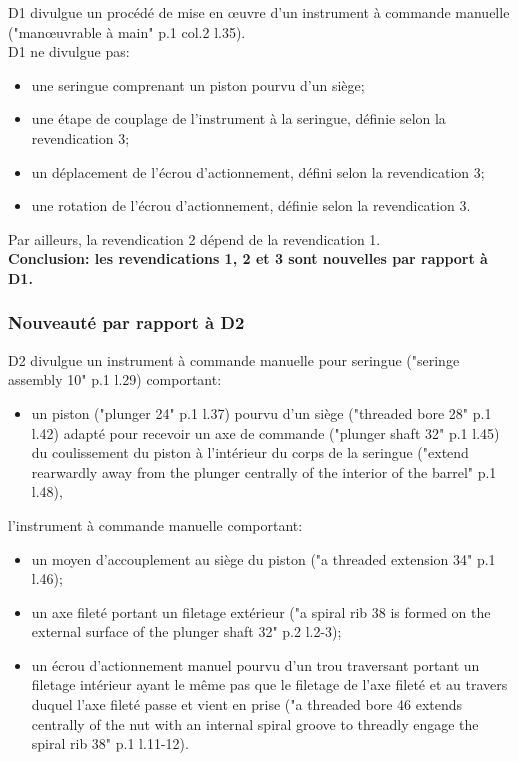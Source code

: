 D1 divulgue un procédé de mise en œuvre d'un instrument à commande manuelle
("manœuvrable à main" p.1 col.2 l.35).\\

D1 ne divulgue pas:
\begin{itemize}
  \item une seringue comprenant un piston pourvu d'un siège;
  \item une étape de couplage de l'instrument à la seringue, définie selon la revendication 3;
  \item un déplacement de l'écrou d'actionnement, défini selon la revendication 3;
  \item une rotation de l'écrou d'actionnement, définie selon la revendication 3.\\
\end{itemize}

Par ailleurs, la revendication 2 dépend de la revendication 1.\\

\textbf{Conclusion: les revendications 1, 2 et 3 sont nouvelles par rapport à D1.}\newpage

\subsubsection{Nouveauté par rapport à D2}

D2 divulgue un instrument à commande manuelle pour seringue
("seringe assembly 10" p.1 l.29) comportant:
\begin{itemize}
  \item un piston ("plunger 24" p.1 l.37) pourvu d'un siège ("threaded bore 28" p.1 l.42)
  adapté pour recevoir un axe de commande ("plunger shaft 32" p.1 l.45) du coulissement
  du piston à l'intérieur du corps de la seringue ("extend rearwardly away from
  the plunger centrally of the interior of the barrel" p.1 l.48),
\end{itemize}
 l'instrument à commande manuelle comportant:
\begin{itemize}
  \item un moyen d'accouplement au siège du piston ("a threaded extension 34" p.1 l.46);
  \item un axe fileté portant un filetage extérieur ("a spiral rib 38 is formed
  on the external surface of the plunger shaft 32" p.2 l.2-3);
  \item un écrou d'actionnement manuel pourvu d'un trou traversant portant un filetage intérieur
  ayant le même pas que le filetage de l'axe fileté et au travers duquel l'axe fileté
  passe et vient en prise ("a threaded bore 46 extends centrally of the nut with
  an internal spiral groove to threadly engage the spiral rib 38" p.1 l.11-12).\\
\end{itemize}

